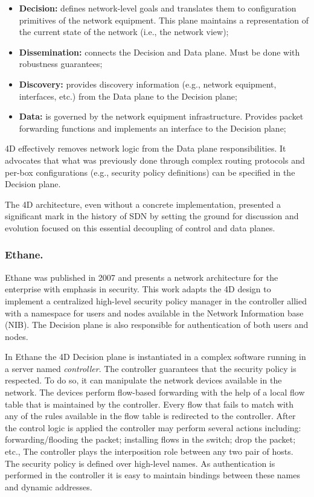 \begin{itemize}
\item[] \textbf{Decision:}  defines network-level goals and 
  translates them to configuration primitives of the network
  equipment. This plane maintains a representation of the current state of the network (i.e., the network view); 
\item[] \textbf{Dissemination:}  connects the Decision and Data plane. Must be
  done with robustness guarantees; 
\item[] \textbf{Discovery:} provides discovery information (e.g., network
  equipment, interfaces, etc.) from the Data plane to the Decision plane; 
\item[] \textbf{Data:}  is governed by the network equipment
  infrastructure. Provides packet forwarding functions and implements
  an interface to the Decision plane;  
\end{itemize}

4D effectively removes network logic  from the Data plane
responsibilities. It advocates that what was previously done through complex
routing protocols and per-box configurations (e.g., security policy
definitions)  can be specified in the Decision plane. 

The 4D architecture, even without a concrete implementation, 
presented a significant mark in the history of SDN by setting the
ground for discussion and evolution focused on this essential
decoupling of control and data planes.  

\subsubsection{Ethane.}Ethane \cite{Casado:2007kb} was published in 2007 and presents a
network architecture for the enterprise with emphasis in
security. This work adapts the 4D design to implement a centralized
high-level security policy manager in the controller allied with a namespace  for users and nodes
available in the Network Information base (NIB). The Decision plane is also responsible for
authentication of both users and nodes. 

In Ethane the 4D Decision plane  is instantiated in a complex software
running in a server named \emph{controller}. The controller guarantees
that the security policy is respected. To do so, it can manipulate the network
devices available in the network. The devices perform  flow-based
forwarding  with the help of a local  flow table that is maintained by the
controller. Every flow that fails to match with any of the rules
available in the flow table  is redirected to the controller. After the
control logic is applied the controller may perform several actions
including: forwarding/flooding the packet;  installing flows in the
switch;  drop the packet; etc., The controller plays the interposition role
between any two pair of hosts. The security policy is defined over
high-level names. As
authentication is performed in the controller it is easy to maintain
bindings between these names and dynamic addresses. 

